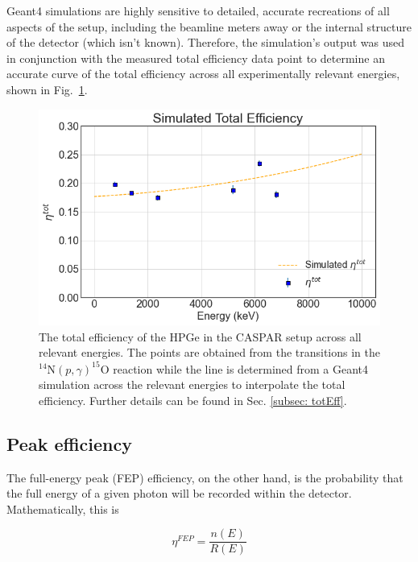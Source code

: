 Geant4 simulations are highly sensitive to detailed, accurate recreations of all aspects of the setup, including the beamline meters away or the internal structure of the detector (which isn't known). Therefore, the simulation's output was used in conjunction with the measured total efficiency data point to determine an accurate curve of the total efficiency across all experimentally relevant energies, shown in Fig.\ \ref{fig: totalEfficiency}.

\begin{figure}
\centering
\includegraphics[width=\linewidth]{figures/totalEfficiency.png}
\caption{The total efficiency of the HPGe in the CASPAR setup across all relevant energies. The points are obtained from the transitions in the $^{14}$N$\left( p,\gamma \right) ^{15}$O reaction while the line is determined from a Geant4 simulation across the relevant energies to interpolate the total efficiency. Further details can be found in Sec. \ref{subsec: totEff}. }
\label{fig: totalEfficiency}
\end{figure}



\subsection{Peak efficiency}

The full-energy peak (FEP) efficiency, on the other hand, is the probability that the full energy of a given photon will be recorded within the detector. Mathematically, this is

\begin{equation}
\eta^{FEP} = \dfrac{n(E)}{R(E)}
\end{equation}

